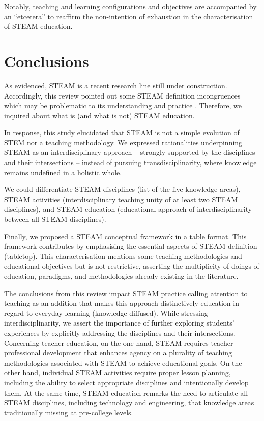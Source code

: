 \documentclass[english]{textolivre}
\begin{document}
Notably, teaching and learning configurations and objectives are accompanied by an “etcetera” to reaffirm the non-intention of exhaustion in the characterisation of STEAM education.



\section{Conclusions}

As \cite{marin-marin_steam_2021} evidenced, STEAM is a recent research line still under construction. Accordingly, this review pointed out some STEAM definition incongruences which may be problematic to its understanding and practice \cite{perignat_steam_2019}. Therefore, we inquired about what is (and what is not) STEAM education.

In response, this study elucidated that STEAM is not a simple evolution of STEM nor a teaching methodology. We expressed rationalities underpinning STEAM as an interdisciplinary approach – strongly supported by the disciplines and their intersections – instead of pursuing transdisciplinarity, where knowledge remains undefined in a holistic whole.

We could differentiate STEAM disciplines (list of the five knowledge areas), STEAM activities (interdisciplinary teaching unity of at least two STEAM disciplines), and STEAM education (educational approach of interdisciplinarity between all STEAM disciplines).

Finally, we proposed a STEAM conceptual framework in a table format. This framework contributes by emphasising the essential aspects of STEAM definition (tabletop). This characterisation mentions some teaching methodologies and educational objectives but is not restrictive, asserting the multiplicity of doings of education, paradigms, and methodologies already existing in the literature.

The conclusions from this review impact STEAM practice calling attention to teaching as an addition that makes this approach distinctively education in regard to everyday learning (knowledge diffused). While stressing interdisciplinarity, we assert the importance of further exploring students’ experiences by explicitly addressing the disciplines and their intersections. Concerning teacher education, on the one hand, STEAM requires teacher professional development that enhances agency on a plurality of teaching methodologies associated with STEAM to achieve educational goals. On the other hand, individual STEAM activities require proper lesson planning, including the ability to select appropriate disciplines and intentionally develop them. At the same time, STEAM education remarks the need to articulate all STEAM disciplines, including technology and engineering, that knowledge areas traditionally missing at pre-college levels.
\end{document}
